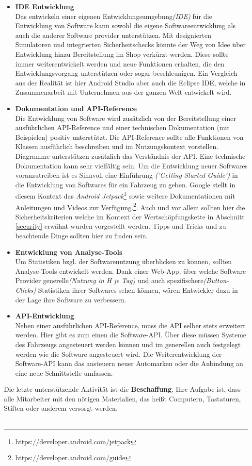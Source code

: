 \begin{itemize}
	\item[] \hspace{-0.6cm} \textbf{IDE Entwicklung}\\
	Das entwickeln einer eigenen Entwicklungsumgebung\textit{(IDE)} für die Entwicklung von Software kann sowohl die eigene Softwareentwicklung als auch die anderer Software provider unterstützen. Mit designierten Simulatoren und integrierten Sicherheitschecks könnte der Weg von Idee über Entwicklung hinzu Bereitstellung im Shop verkürzt werden. Diese sollte immer weiterentwickelt werden und neue Funktionen erhalten, die den Entwicklungsvorgang unterstützen oder sogar beschleunigen. Ein Vergleich aus der Realität ist hier Android Studio aber auch die Eclipse IDE, welche in Zusammenarbeit mit Unternehmen aus der ganzen Welt entwickelt wird.
	
	\item[] \hspace{-0.6cm} \textbf{Dokumentation und API-Reference}\\
	Die Entwicklung von Software wird zusätzlich von der Bereitstellung einer ausführlichen API-Reference und einer technischen Dokumentation (mit Beispielen) positiv unterstützt. Die API-Reference sollte alle Funktionen von Klassen ausführlich beschreiben und im Nutzungskontext vorstellen. Diagramme unterstützen zusätzlich das Verständnis der API. Eine technische Dokumentation kann sehr vielfältig sein. Um die Entwicklung neuer Softwares voranzutreiben ist es Sinnvoll eine Einführung \textit{('Getting Started Guide')} in die Entwicklung von Softwares für ein Fahrzeug zu geben. Google stellt in diesem Kontext das \textit{Android Jetpack}\footnote{https://developer.android.com/jetpack} sowie weitere Dokumentationen mit Anleitungen und Videos zur Verfügung.\footnote{https://developer.android.com/guide}. Auch und vor allem sollten hier die Sicherheitskriterien welche im Kontext der Wertschöpfungskette in Abschnitt \ref{security} erwähnt wurden vorgestellt werden. Tipps und Tricks und zu beachtende Dinge sollten hier zu finden sein.
	
	\item[] \hspace{-0.6cm} \textbf{Entwicklung von Analyse-Tools}\\
	Um Statistiken bzgl. der Softwarenutzung überblicken zu können, sollten Analyse-Tools entwickelt werden. Dank einer Web-App, über welche Software Provider generelle\textit{(Nutzung in H je Tag)} und auch spezifischere\textit{(Button-Clicks)} Statistiken ihrer Softwares sehen können, wären Entwickler dazu in der Lage ihre Software zu verbessern.
	
	\item[] \hspace{-0.6cm} \textbf{API-Entwicklung}\\
	Neben einer ausführlichen API-Reference, muss die API selber stets erweitert werden. Hier gibt es zum einen die Software-API. Über diese müssen Systeme des Fahrzeugs angesteuert werden können und im generellen auch festgelegt werden wie die Software angesteuert wird. Die Weiterentwicklung der Software-API kann das ansteuern neuer Automarken oder die Anbindung an eine neue Schnittstelle umfassen. 
\end{itemize}
Die letzte unterstützende Aktivität ist die \textbf{Beschaffung}. Ihre Aufgabe ist, dass alle Mitarbeiter mit den nötigen Materialien, das heißt Computern, Tastaturen, Stiften oder anderem versorgt werden.\\\\